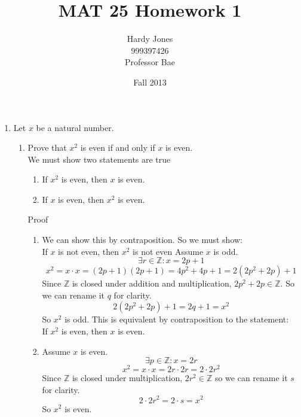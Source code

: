 \documentclass[12pt]{article}
\begin{document}
\title{MAT 25 Homework 1}
\author{Hardy Jones\\
        999397426\\
        Professor Bae}
\date{Fall 2013}

\maketitle

\begin{enumerate}
    \item Let $x$ be a natural number.
    \begin{enumerate}
        \item Prove that $x^2$ is even if and only if $x$ is even. \\

            We must show two statements are true
            \begin{enumerate}
                \item If $x^2$ is even, then $x$ is even.
                \item If $x$ is even, then $x^2$ is even.
            \end{enumerate}

            Proof

            \begin{enumerate}
                \item
                    We can show this by contraposition.
                    So we must show: \\
                    If $x$ is not even, then $x^2$ is not even
                    Assume $x$ is odd.
                    \[\exists r \in \mathbb{Z} : x = 2p + 1\]
                    \[
                        x^2 = x \cdot x = (2p + 1) (2p + 1) = 4p^2 + 4p + 1 =
                        2(2p^2 + 2p) + 1
                    \]
                    Since $\mathbb{Z}$ is closed under addition and multiplication,
                    $2p^2 + 2p \in \mathbb{Z}$.
                    So we can rename it $q$ for clarity.
                    \[2(2p^2 + 2p) + 1 = 2q + 1 = x^2\]
                    So $x^2$ is odd.
                    This is equivalent by contraposition to the statement: \\
                    If $x^2$ is even, then $x$ is even.

                \item
                    Assume $x$ is even.
                    \[\exists p \in \mathbb{Z} : x = 2r\]
                    \[x^2 = x \cdot x = 2r \cdot 2r = 2 \cdot 2r^2\]
                    Since $\mathbb{Z}$ is closed under multiplication,
                    $2r^2 \in \mathbb{Z}$ so we can rename it $s$ for clarity.
                    \[2 \cdot 2r^2 = 2 \cdot s = x^2\]
                    So $x^2$ is even.
            \end{enumerate}


\end{enumerate}
\end{enumerate}
\end{document}
